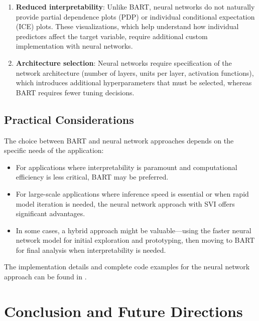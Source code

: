 \documentclass[11pt]{amsart}
\theoremstyle{definition}
\begin{document}
\begin{enumerate}
    \item \textbf{Reduced interpretability}: Unlike BART, neural networks do not naturally provide partial dependence plots
          (PDP) or individual conditional expectation (ICE) plots. These visualizations, which help understand how individual
          predictors affect the target variable, require additional custom implementation with neural networks.

    \item \textbf{Architecture selection}: Neural networks require specification of the network architecture (number of
          layers, units per layer, activation functions), which introduces additional hyperparameters that must be selected,
          whereas BART requires fewer tuning decisions.
\end{enumerate}

\subsection{Practical Considerations}

The choice between BART and neural network approaches depends on the specific needs of the application:

\begin{itemize}
    \item For applications where interpretability is paramount and computational efficiency is less critical, BART may be
          preferred.

    \item For large-scale applications where inference speed is essential or when rapid model iteration is needed, the neural
          network approach with SVI offers significant advantages.

    \item In some cases, a hybrid approach might be valuable—using the faster neural network model for initial exploration
          and prototyping, then moving to BART for final analysis when interpretability is needed.
\end{itemize}

The implementation details and complete code examples for the neural network approach can be found in
\cite{orduz_revenue_retention_numpyro}.

\section{Conclusion and Future Directions}
\end{document}
